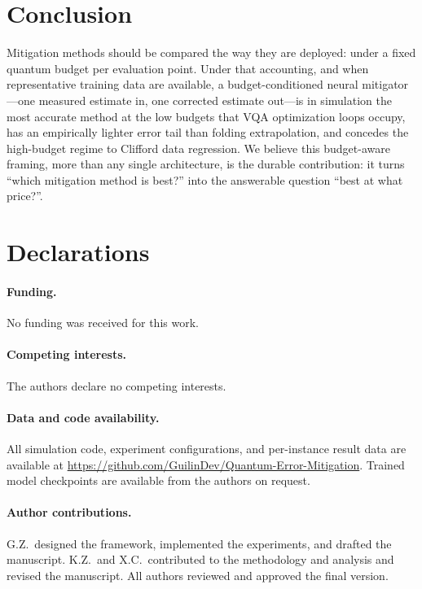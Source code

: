 \documentclass[11pt]{article}
\begin{document}
\section{Conclusion}
\label{sec:conclusion}

Mitigation methods should be compared the way they are deployed: under a fixed quantum budget per evaluation point. Under that accounting, and when representative training data are available, a budget-conditioned neural mitigator---one measured estimate in, one corrected estimate out---is in simulation the most accurate method at the low budgets that VQA optimization loops occupy, has an empirically lighter error tail than folding extrapolation, and concedes the high-budget regime to Clifford data regression. We believe this budget-aware framing, more than any single architecture, is the durable contribution: it turns ``which mitigation method is best?'' into the answerable question ``best at what price?''.

\section*{Declarations}

\paragraph{Funding.} No funding was received for this work.

\paragraph{Competing interests.} The authors declare no competing interests.

\paragraph{Data and code availability.} All simulation code, experiment configurations, and per-instance result data are available at \url{https://github.com/GuilinDev/Quantum-Error-Mitigation}. Trained model checkpoints are available from the authors on request.

\paragraph{Author contributions.} G.Z.\ designed the framework, implemented the experiments, and drafted the manuscript. K.Z.\ and X.C.\ contributed to the methodology and analysis and revised the manuscript. All authors reviewed and approved the final version.
\end{document}
